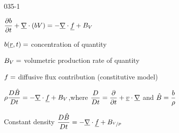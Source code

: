 \begin{mitframe}{035-1}

        
\begin{listone}

	\item$\dfrac{\partial{b}}{\partial{t}}+\gradop\cdot(b\vol)=-\gradop\cdot\uline{\fug}+\exergy_{\vol}$
	\item $b(\uline{\pos},t)=$ concentration of quantity
	\item $\exergy_{\vol} =$ volumetric production rate of quantity

	\item $\fug =$ diffusive flux contribution (constitutive model)

	\item $\dens\dfrac{\elecdisplace\hat{\exergy}}{\elecdisplace{t}}=-\gradop\cdot\uline{\fug}+\exergy_{\vol}$,where $\dfrac{\elecdisplace}{\elecdisplace{t}}=\dfrac{\partial}{\partial{t}}+\uline{\vvel}\cdot\gradop$ and $\hat{\exergy}=\dfrac{b}{\dens}$

				\begin{listtwo}

					\item Constant density $\dfrac{\elecdisplace\hat{\exergy}}{\elecdisplace{t}}=-\gradop\cdot\uline{\fug}+\exergy_{\sfrac{\vol}{\p}}$
            
				\end{listtwo}
                
\end{listone}

\end{mitframe}